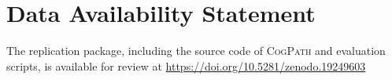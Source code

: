 \section{Data Availability Statement}
The replication package, including the source code of \textsc{CogPath} and evaluation scripts, is available for review at \url{https://doi.org/10.5281/zenodo.19249603}
